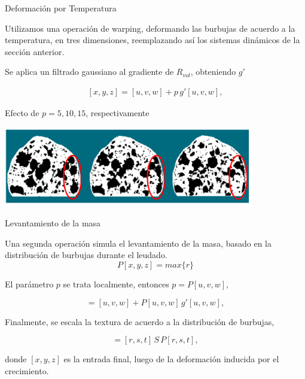 \documentclass[spanish,unknownkeysallowed]{beamer}
\begin{document}
\begin{frame}{Deformación por Temperatura}

Utilizamos una operación de warping, deformando las burbujas de acuerdo a la temperatura, en tres dimensiones, reemplazando así los sistemas dinámicos de la sección anterior.

Se aplica un filtrado gaussiano al gradiente de $R_{vol}$, obteniendo $g'$

\begin{align*}
\displaystyle
[x,y,z] = [u,v,w] + p\, g'[u,v,w],
\end{align*}

Efecto de $p = 5,10,15$, respectivamente
\centerline{\includegraphics[width=11cm]{../figures/parameterp}}

\end{frame}

\begin{frame}{Levantamiento de la masa}

Una segunda operación simula el levantamiento de la masa, basado en la distribución de burbujas durante el leudado.
\begin{equation*}
P[x,y,z] = max \bigg\{r\bigg\}
\end{equation*}

El parámetro $p$ se trata localmente, entonces $p = P[u,v,w],$

\begin{equation*}
[r,s,t] = [u,v,w] + P[u,v,w] \, g'[u,v,w],
\end{equation*}



Finalmente, se escala la textura de acuerdo a la distribución de burbujas,


\begin{equation}
[x,y,z] = [r,s,t]\, S \, P[r,s,t],
\end{equation}

\noindent donde $[x,y,z]$ es la entrada final, luego de la deformación inducida por el crecimiento.

\end{frame}
\end{document}
